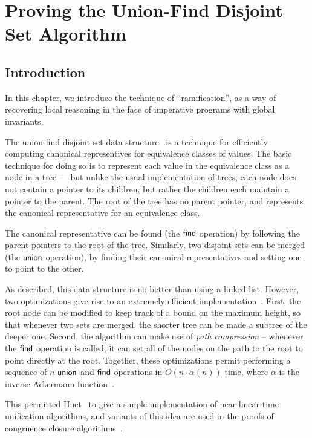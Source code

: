 \chapter{Proving the Union-Find Disjoint Set Algorithm}

\section{Introduction}

In this chapter, we introduce the technique of ``ramification'', as a
way of recovering local reasoning in the face of imperative programs
with global invariants.

The union-find disjoint set data structure~\cite{union-find} is a
technique for efficiently computing canonical representives for
equivalence classes of values. The basic technique for doing so is to
represent each value in the equivalence class as a node in a tree ---
but unlike the usual implementation of trees, each node does not
contain a pointer to its children, but rather the children each
maintain a pointer to the parent. The root of the tree has no parent
pointer, and represents the canonical representative for an
equivalence class.

The canonical representative can be found (the $\mathsf{find}$ operation) by
following the parent pointers to the root of the tree. Similarly, two
disjoint sets can be merged (the $\mathsf{union}$ operation), by finding their
canonical representatives and setting one to point to the other.

As described, this data structure is no better than using a linked
list. However, two optimizations give rise to an extremely efficient
implementation~\cite{galler-fischer-union-find}. First, the root node
can be modified to keep track of a bound on the maximum height, so
that whenever two sets are merged, the shorter tree can be made a
subtree of the deeper one. Second, the algorithm can make use of
\emph{path compression} -- whenever the $\mathsf{find}$ operation is called,
it can set all of the nodes on the path to the root to point directly
at the root. Together, these optimizations permit performing a
sequence of $n$ $\mathsf{union}$ and $\mathsf{find}$ operations in $O(n \cdot
\alpha(n))$ time, where $\alpha$ is the inverse Ackermann
function~\cite{tarjan-union-find-bound}.

This permitted Huet~\cite{huet-unification} to give a simple
implementation of near-linear-time unification algorithms, and
variants of this idea are used in the proofs of congruence closure
algorithms~\cite{congruence-closure}.

